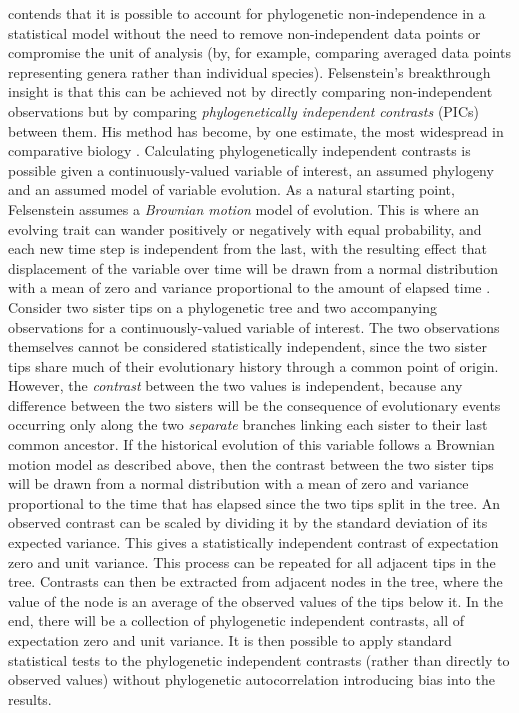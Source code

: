 \textcite{felsenstein_phylogenies_1985} contends that it is possible to account for phylogenetic non-independence in a statistical model without the need to remove non-independent data points or compromise the unit of analysis (by, for example, comparing averaged data points representing genera rather than individual species). Felsenstein's breakthrough insight is that this can be achieved not by directly comparing non-independent observations but by comparing \emph{phylogenetically independent contrasts} (PICs) between them. His method has become, by one estimate, the most widespread in comparative biology \autocite[p.~162]{nunn_comparative_2011}. Calculating phylogenetically independent contrasts is possible given a continuously-valued variable of interest, an assumed phylogeny and an assumed model of variable evolution. As a natural starting point, Felsenstein assumes a \emph{Brownian motion} model of evolution. This is where an evolving trait can wander positively or negatively with equal probability, and each new time step is independent from the last, with the resulting effect that displacement of the variable over time will be drawn from a normal distribution with a mean of zero and variance proportional to the amount of elapsed time \autocite[p.~8]{felsenstein_phylogenies_1985}. Consider two sister tips on a phylogenetic tree and two accompanying observations for a continuously-valued variable of interest. The two observations themselves cannot be considered statistically independent, since the two sister tips share much of their evolutionary history through a common point of origin. However, the \emph{contrast} between the two values is independent, because any difference between the two sisters will be the consequence of evolutionary events occurring only along the two \emph{separate} branches linking each sister to their last common ancestor. If the historical evolution of this variable follows a Brownian motion model as described above, then the contrast between the two sister tips will be drawn from a normal distribution with a mean of zero and variance proportional to the time that has elapsed since the two tips split in the tree. An observed contrast can be scaled by dividing it by the standard deviation of its expected variance. This gives a statistically independent contrast of expectation zero and unit variance. This process can be repeated for all adjacent tips in the tree. Contrasts can then be extracted from adjacent nodes in the tree, where the value of the node is an average of the observed values of the tips below it. In the end, there will be a collection of phylogenetic independent contrasts, all of expectation zero and unit variance. It is then possible to apply standard statistical tests to the phylogenetic independent contrasts (rather than directly to observed values) without phylogenetic autocorrelation introducing bias into the results.

